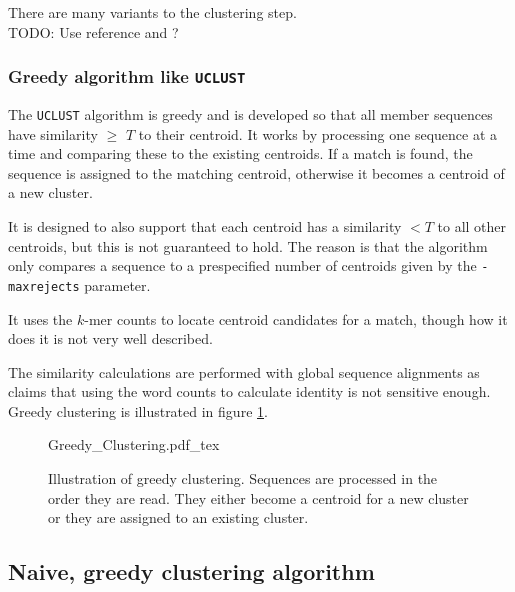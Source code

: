 There are many variants to the clustering step.\\
TODO: Use reference \cite{hartuv} and \cite{kawaji}?



\subsubsection{Greedy algorithm like \texttt{UCLUST}}
The \texttt{UCLUST} algorithm is greedy and is developed so that all member
sequences have similarity $\geq$ $T$ to their centroid.  It works by processing
one sequence at a time and comparing these to the existing centroids. If a
match is found, the sequence is assigned to the matching centroid, otherwise it
becomes a centroid of a new cluster.

It is designed to also support that each centroid has a similarity $<T$ to all
other centroids, but this is not guaranteed to hold. The reason is that the
algorithm only compares a sequence to a prespecified number of centroids given
by the \texttt{-maxrejects} parameter.

It uses the $k$-mer counts to locate centroid candidates for a match, though
how it does it is not very well described.

The similarity calculations are performed with global sequence alignments as
\cite{usearch_algorithm} claims that using the word counts to calculate
identity is not sensitive enough. Greedy clustering is illustrated in figure
\ref{fig:greedy_clustering}.

\begin{figure}[h!]
  \def\svgwidth{\columnwidth}
  {Greedy_Clustering.pdf_tex}
  \caption{Illustration of greedy clustering. Sequences are processed in the order they are read. They either become a centroid for a new cluster or they are assigned to an existing cluster.}
  \label{fig:greedy_clustering}
\end{figure}




\subsection{Naive, greedy clustering algorithm}

